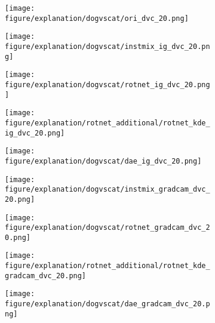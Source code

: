 \documentclass{article} \usepackage{iclr2021_conference,times}
\begin{document}
\begin{figure}[h!]
\fi
\begin{subfigure}{.11\textwidth}
  \centering
  \texttt{[image: figure/explanation/dogvscat/ori\_dvc\_20.png]}
\end{subfigure}
\hspace{-2mm}
\begin{subfigure}{.11\textwidth}
  \centering
  \texttt{[image: figure/explanation/dogvscat/instmix\_ig\_dvc\_20.png]}
\end{subfigure}
\hspace{-2mm}
\begin{subfigure}{.11\textwidth}
  \centering
  \texttt{[image: figure/explanation/dogvscat/rotnet\_ig\_dvc\_20.png]}
\end{subfigure}
\hspace{-2mm}
\begin{subfigure}{.11\textwidth}
  \centering
  \texttt{[image: figure/explanation/rotnet\_additional/rotnet\_kde\_ig\_dvc\_20.png]}
\end{subfigure}
\hspace{-2mm}
\begin{subfigure}{.11\textwidth}
  \centering
  \texttt{[image: figure/explanation/dogvscat/dae\_ig\_dvc\_20.png]}
\end{subfigure}
\hspace{-2mm}
\begin{subfigure}{.11\textwidth}
  \centering
  \texttt{[image: figure/explanation/dogvscat/instmix\_gradcam\_dvc\_20.png]}
\end{subfigure}
\hspace{-2mm}
\begin{subfigure}{.11\textwidth}
  \centering
  \texttt{[image: figure/explanation/dogvscat/rotnet\_gradcam\_dvc\_20.png]}
\end{subfigure}
\hspace{-2mm}
\begin{subfigure}{.11\textwidth}
  \centering
  \texttt{[image: figure/explanation/rotnet\_additional/rotnet\_kde\_gradcam\_dvc\_20.png]}
\end{subfigure}
\hspace{-2mm}
\begin{subfigure}{.11\textwidth}
  \centering
  \texttt{[image: figure/explanation/dogvscat/dae\_gradcam\_dvc\_20.png]}
\end{subfigure}\\
\begin{subfigure}{.11\textwidth}

\end{subfigure}
\end{figure}
\end{document}
